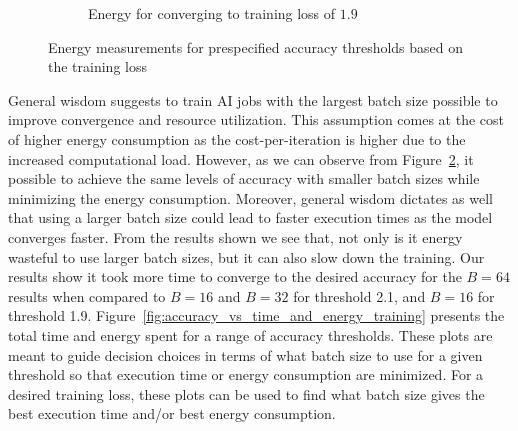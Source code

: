 \documentclass{article}
\begin{document}
{\begin{figure}[!t]
\begin{subfigure}[b]{0.47 \textwidth}
                \caption{Energy for converging to training loss of $1.9$}
                \label{fig:convergence_energy_training_190}
            \end{subfigure}
            \caption{Energy measurements for prespecified accuracy thresholds based on the training loss}
            \label{fig:convergence_threshold_training}
        \end{figure}

        General wisdom suggests to train AI jobs with the largest batch size possible to improve convergence and resource utilization. This assumption comes at the cost of higher energy consumption as the cost-per-iteration is higher due to the increased computational load. However, as we can observe from Figure~\ref{fig:convergence_threshold_training}, it possible to achieve the same levels of accuracy with smaller batch sizes while minimizing the energy consumption. Moreover, general wisdom dictates as well that using a larger batch size could lead to faster execution times as the model converges faster. From the results shown we see that, not only is it energy wasteful to use larger batch sizes, but it can also slow down the training. Our results show it took more time to converge to the desired accuracy for the $B = 64$ results when compared to $B = 16$ and $B = 32$ for threshold 2.1, and $B = 16$ for threshold 1.9. Figure~\ref{fig:accuracy_vs_time_and_energy_training} presents the total time and energy spent for a range of accuracy thresholds. These plots are meant to guide decision choices in terms of what batch size to use for a given threshold so that execution time or energy consumption are minimized. For a desired training loss, these plots can be used to find what batch size gives the best execution time and/or best energy consumption.

}
\end{document}
